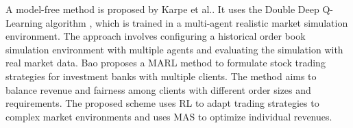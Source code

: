 \documentclass[acmsmall]{acmart}
\begin{document}
A model-free method is proposed by Karpe et al.\cite{10.1145/3383455.3422570}. It uses the Double Deep Q-Learning algorithm \cite{doubleq}, which is trained in a multi-agent realistic market simulation environment. The approach involves configuring a historical order book simulation environment with multiple agents and evaluating the simulation with real market data.
Bao \cite{bao2019fairness} proposes a MARL method to formulate stock trading strategies for investment banks with multiple clients. The method aims to balance revenue and fairness among clients with different order sizes and requirements. The proposed scheme uses RL to adapt trading strategies to complex market environments and uses MAS to optimize individual revenues. 
\end{document}
